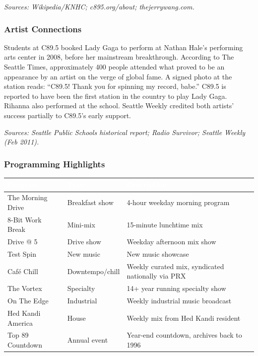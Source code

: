 \documentclass[11pt,letterpaper]{article}
\newcommand{\tableheader}[1]{\textbf{\sffamily\textcolor{white}{#1}}}
\begin{document}
\textit{Sources: Wikipedia/KNHC; c895.org/about; thejerrywang.com.}

\subsubsection{Artist Connections}

Students at C89.5 booked Lady Gaga to perform at Nathan Hale's performing arts center in 2008, before her mainstream breakthrough. According to The Seattle Times, approximately 400 people attended what proved to be an appearance by an artist on the verge of global fame. A signed photo at the station reads: ``C89.5! Thank you for spinning my record, babe.'' C89.5 is reported to have been the first station in the country to play Lady Gaga. Rihanna also performed at the school. Seattle Weekly credited both artists' success partially to C89.5's early support.

\textit{Sources: Seattle Public Schools historical report; Radio Survivor; Seattle Weekly (Feb 2011).}

\subsubsection{Programming Highlights}

\begin{center}
\begin{tabularx}{\textwidth}{L{3.5cm}L{2.5cm}X}
\toprule
{}
\tableheader{Program} & \tableheader{Type} & \tableheader{Description} \\
\midrule
The Morning Drive & Breakfast show & 4-hour weekday morning program \\
8-Bit Work Break & Mini-mix & 15-minute lunchtime mix \\
Drive @ 5 & Drive show & Weekday afternoon mix show \\
Test Spin & New music & New music showcase \\
Café Chill & Downtempo/chill & Weekly curated mix, syndicated nationally via PRX \\
The Vortex & Specialty & 14+ year running specialty show \\
On The Edge & Industrial & Weekly industrial music broadcast \\
Hed Kandi America & House & Weekly mix from Hed Kandi resident \\
Top 89 Countdown & Annual event & Year-end countdown, archives back to 1996 \\
\bottomrule
\end{tabularx}
\end{center}
\end{document}
